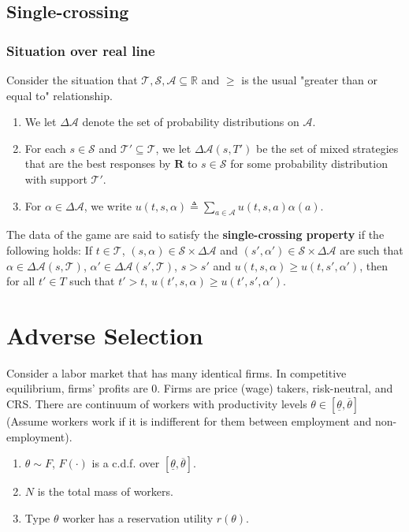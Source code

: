 \documentclass[11pt]{elegantbook_2}
\begin{document}
\subsection{Single-crossing}

\subsubsection{Situation over real line}
Consider the situation that $\mathcal{T},\mathcal{S},\mathcal{A}\subseteq \mathbb{R}$ and $\geq$ is the usual "greater than or equal to" relationship.

\begin{enumerate}
    \item We let $\Delta \mathcal{A}$ denote the set of probability distributions on $\mathcal{A}$.
    \item For each $s\in \mathcal{S}$ and $\mathcal{T}'\subseteq \mathcal{T}$, we let $\Delta\mathcal{A}(s,T')$ be the set of mixed strategies that are the best responses by $\mathbf{R}$ to $s\in \mathcal{S}$ for some probability distribution with support $\mathcal{T}'$.
    \item For $\alpha\in \Delta\mathcal{A}$, we write $u(t,s,\alpha)\triangleq \sum_{a\in \mathcal{A}}u(t,s,a)\alpha(a)$.
\end{enumerate}

\begin{definition}
    The data of the game are said to satisfy the \textbf{single-crossing property} if the following holds: If $t\in \mathcal{T}$, $(s,\alpha)\in \mathcal{S}\times \Delta\mathcal{A}$ and $(s',\alpha')\in \mathcal{S}\times \Delta\mathcal{A}$ are such that $\alpha\in \Delta\mathcal{A}(s,\mathcal{T})$, $\alpha'\in \Delta\mathcal{A}(s',\mathcal{T})$, $s>s'$ and $u(t,s,\alpha)\geq u(t,s',\alpha')$, then for all $t'\in T$ such that $t'>t$, $u(t',s,\alpha)\geq u(t',s',\alpha')$.
\end{definition}

\section{Adverse Selection}
Consider a labor market that has many identical firms. In competitive equilibrium, firms' profits are $0$. Firms are price (wage) takers, risk-neutral, and CRS. There are continuum of workers with productivity levels $\theta\in\left[\underline{\theta},\overline{\theta}\right]$ (Assume workers work if it is indifferent for them between employment and non-employment).
\begin{enumerate}
    \item $\theta\sim F$, $F(\cdot)$ is a c.d.f. over $\left[\underline{\theta},\overline{\theta}\right]$.
    \item $N$ is the total mass of workers.
    \item Type $\theta$ worker has a reservation utility $r(\theta)$.
\end{enumerate}
\end{document}

